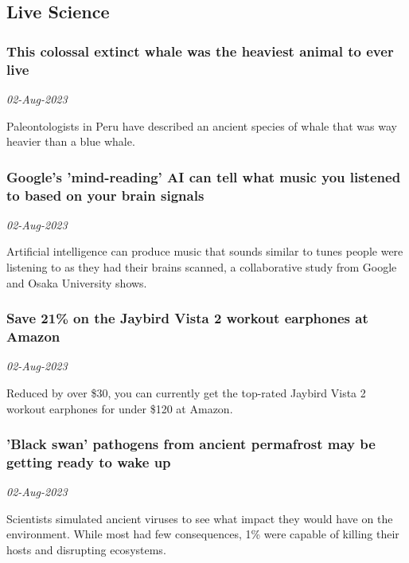 \subsection{Live Science \href{https://www.livescience.com/}{}}
\subsubsection{This colossal extinct whale was the heaviest animal to ever live \href{https://www.livescience.com/animals/whales/this-colossal-extinct-whale-was-the-heaviest-animal-to-ever-live}{}}
\textit{02-Aug-2023}

Paleontologists in Peru have described an ancient species of whale that was way heavier than a blue whale.
\subsubsection{Google's 'mind-reading' AI can tell what music you listened to based on your brain signals \href{https://www.livescience.com/health/neuroscience/googles-mind-reading-ai-can-tell-what-music-you-listened-to-based-on-your-brain-signals}{}}
\textit{02-Aug-2023}

Artificial intelligence can produce music that sounds similar to tunes people were listening to as they had their brains scanned, a collaborative study from Google and Osaka University shows.
\subsubsection{Save 21\% on the Jaybird Vista 2 workout earphones at Amazon \href{https://www.livescience.com/health/exercise/save-21-on-the-jaybird-vista-2-workout-earphones-at-amazon}{}}
\textit{02-Aug-2023}

Reduced by over \$30, you can currently get the top-rated Jaybird Vista 2 workout earphones for under \$120 at Amazon.
\subsubsection{'Black swan' pathogens from ancient permafrost may be getting ready to wake up \href{https://www.livescience.com/planet-earth/arctic/black-swan-pathogens-from-ancient-permafrost-may-be-getting-ready-to-wake-up}{}}
\textit{02-Aug-2023}

Scientists simulated ancient viruses to see what impact they would have on the environment. While most had few consequences, 1\% were capable of killing their hosts and disrupting ecosystems.
